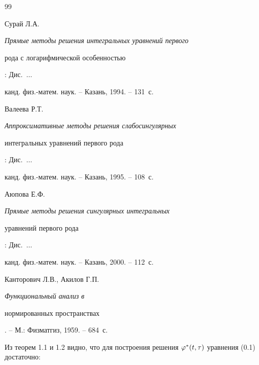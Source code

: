 \begin{thebibliography}{99}


Сурай Л.А. {\em Прямые методы решения интегральных уравнений первого 


рода с логарифмической особенностью}: Дис.~$\dotsc$


канд. физ.-матем. наук. -- Казань, 1994. -- 131~с.




Валеева Р.Т. {\em Аппроксимативные методы решения слабосингулярных 


интегральных уравнений первого рода}: Дис.~$\dotsc$


канд. физ.-матем. наук. -- Казань, 1995. -- 108~с.




Аюпова Е.Ф. {\em Прямые методы решения сингулярных интегральных 


уравнений первого рода}: Дис.~$\dotsc$


канд. физ.-матем. наук. -- Казань, 2000. -- 112~с.




Канторович Л.В., Акилов Г.П. {\em Функциональный анализ в 


нормированных пространствах}. -- М.: Физматгиз, 1959. -- 684~с.





\end{thebibliography}





\vskip 2cm












\label{end}

















 








Из теорем 1.1 и 1.2 видно, что для построения решения $\varphi^*(t,\tau)$ уравнения (0.1) достаточно:





